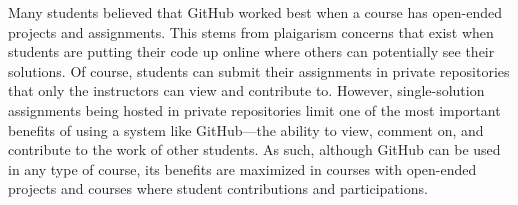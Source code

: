 Many students believed that GitHub worked best when a course has open-ended projects and assignments. This stems from plaigarism concerns that exist when students are putting their code up online where others can potentially see their solutions. Of course, students can submit their assignments in private repositories that only the instructors can view and contribute to. However, single-solution assignments being hosted in private repositories limit one of the most important benefits of using a system like GitHub---the ability to view, comment on, and contribute to the work of other students. As such, although GitHub can be used in any type of course, its benefits are maximized in courses with open-ended projects and courses where student contributions and participations.




